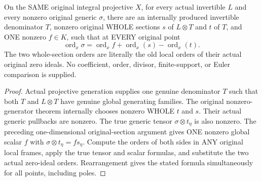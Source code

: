 \begin{theorem}
\label{thm:curve-generic-section-generated-order-difference}
\leanok
{}
On the SAME original integral projective $X$, for every actual
invertible $L$ and every nonzero original generic $\sigma$, there are
an internally produced invertible denominator $T$, nonzero original
WHOLE sections $s$ of $L\otimes T$ and $t$ of $T$, and ONE nonzero
$f\in K$, such that at EVERY original point
\[
 \operatorname{ord}_x\sigma
  =\operatorname{ord}_x f+
    \operatorname{ord}_x(s)-\operatorname{ord}_x(t).
\]
The two whole-section orders are literally the old local orders of
their actual original zero ideals.  No coefficient, order, divisor,
finite-support, or Euler comparison is supplied.
\end{theorem}
\begin{proof}
Actual projective generation supplies one genuine denominator $T$
such that both $T$ and $L\otimes T$ have genuine global generating
families.  The original nonzero-generator theorem internally chooses
nonzero WHOLE $t$ and $s$.  Their actual generic pullbacks are nonzero.
The true generic tensor $\sigma\otimes t_\eta$ is also nonzero.
The preceding one-dimensional original-section argument gives ONE
nonzero global scalar $f$ with
$\sigma\otimes t_\eta=f s_\eta$.  Compute the orders of both sides in
ANY original local frames, apply the true tensor and scalar formulas,
and substitute the two actual zero-ideal orders.  Rearrangement gives
the stated formula simultaneously for all points, including poles.
\end{proof}


